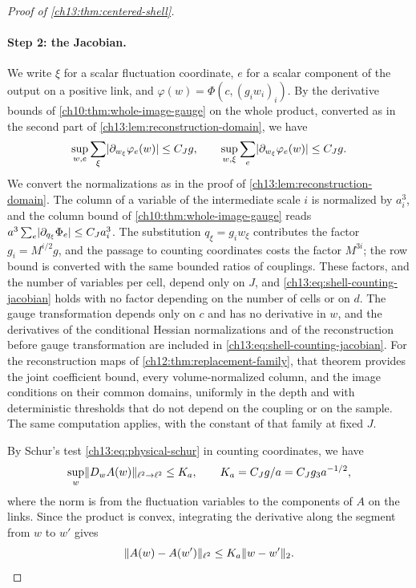 \begin{proof}[Proof of \cref{ch13:thm:centered-shell}]
\paragraph{Step 2: the Jacobian.}
We write $\xi$ for a scalar fluctuation coordinate, $e$ for a scalar component of the output on a positive link, and $\varphi(w)=\Phi(c,(g_iw_i)_i)$. By the derivative bounds of \cref{ch10:thm:whole-image-gauge} on the whole product, converted as in the second part of \cref{ch13:lem:reconstruction-domain}, we have
\begin{equation}\label{ch13:eq:shell-counting-jacobian}
 \sup_{w,e}\sum_\xi\lvert \partial_{w_\xi}\varphi_e(w)\rvert\le C_Jg,\qquad
 \sup_{w,\xi}\sum_e\lvert \partial_{w_\xi}\varphi_e(w)\rvert\le C_Jg.
\end{equation}
We convert the normalizations as in the proof of \cref{ch13:lem:reconstruction-domain}. The column of a variable of the intermediate scale $i$ is normalized by $a_i^3$, and the column bound of \cref{ch10:thm:whole-image-gauge} reads $a^3\sum_e\lvert \partial_{q_\xi}\Phi_e\rvert\le C_Ja_i^3$. The substitution $q_\xi=g_iw_\xi$ contributes the factor $g_i=M^{i/2}g$, and the passage to counting coordinates costs the factor $M^{3i}$; the row bound is converted with the same bounded ratios of couplings. These factors, and the number of variables per cell, depend only on $J$, and \eqref{ch13:eq:shell-counting-jacobian} holds with no factor depending on the number of cells or on $d$. The gauge transformation depends only on $c$ and has no derivative in $w$, and the derivatives of the conditional Hessian normalizations and of the reconstruction before gauge transformation are included in \eqref{ch13:eq:shell-counting-jacobian}. For the reconstruction maps of \cref{ch12:thm:replacement-family}, that theorem provides the joint coefficient bound, every volume-normalized column, and the image conditions on their common domains, uniformly in the depth and with deterministic thresholds that do not depend on the coupling or on the sample. The same computation applies, with the constant of that family at fixed $J$.

By Schur's test \eqref{ch13:eq:physical-schur} in counting coordinates, we have
\begin{equation}\label{ch13:eq:shell-jacobian}
 \sup_w\lVert D_wA(w)\rVert_{\ell^2\to\ell^2}\le K_a,\qquad K_a=C_Jg/a=C_Jg_3a^{-1/2},
\end{equation}
where the norm is from the fluctuation variables to the components of $A$ on the links. Since the product is convex, integrating the derivative along the segment from $w$ to $w'$ gives
\begin{equation}\label{ch13:eq:global-array-lipschitz}
 \lVert A(w)-A(w')\rVert_{\ell^2}\le K_a\lVert w-w'\rVert_2.
\end{equation}


\end{proof}
